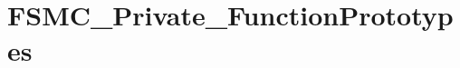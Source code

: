 \hypertarget{group___f_s_m_c___private___function_prototypes}{}\section{F\+S\+M\+C\+\_\+\+Private\+\_\+\+Function\+Prototypes}
\label{group___f_s_m_c___private___function_prototypes}
